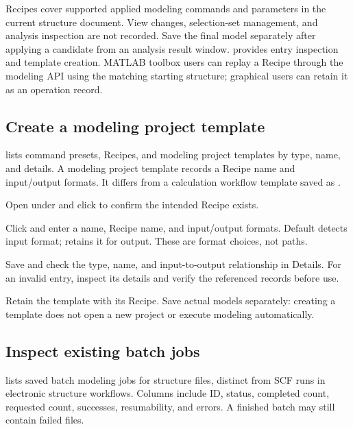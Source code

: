 Recipes cover supported applied modeling commands and parameters in the current structure document. View changes, selection-set management, and analysis inspection are not recorded. Save the final model separately after applying a candidate from an analysis result window.  provides entry inspection and template creation. MATLAB\regmark{} toolbox users can replay a Recipe through the modeling API using the matching starting structure; graphical users can retain it as an operation record.

\subsection{Create a modeling project template}\label{sec:modeling-template-reference}

 lists command presets, Recipes, and modeling project templates by type, name, and details. A modeling project template records a Recipe name and input/output formats. It differs from a calculation workflow template saved as .

\begin{steps}
  \item Open  under  and click  to confirm the intended Recipe exists.
  \item Click  and enter a name, Recipe name, and input/output formats. Default  detects input format;  retains it for output. These are format choices, not paths.
  \item Save and check the type, name, and input-to-output relationship in Details. For an invalid entry, inspect its details and verify the referenced records before use.
  \item Retain the template with its Recipe. Save actual models separately: creating a template does not open a new project or execute modeling automatically.
\end{steps}

\subsection{Inspect existing batch jobs}\label{sec:modeling-jobs-reference}

 lists saved batch modeling jobs for structure files, distinct from SCF runs in electronic structure workflows. Columns include ID, status, completed count, requested count, successes, resumability, and errors. A finished batch may still contain failed files.

